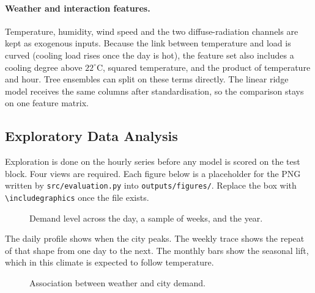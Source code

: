 \paragraph{Weather and interaction features.}
Temperature, humidity, wind speed and the two diffuse-radiation channels are
kept as exogenous inputs. Because the link between temperature and load is
curved (cooling load rises once the day is hot), the feature set also
includes a cooling degree above \(22^\circ\mathrm{C}\), squared temperature,
and the product of temperature and hour. Tree ensembles can split on these
terms directly. The linear ridge model receives the same columns after
standardisation, so the comparison stays on one feature matrix.

\subsection{Exploratory Data Analysis}
\label{sec:eda}

Exploration is done on the hourly series before any model is scored on the
test block. Four views are required. Each figure below is a placeholder for
the PNG written by \texttt{src/evaluation.py} into \texttt{outputs/figures/}.
Replace the box with \verb|\includegraphics| once the file exists.

\begin{figure}[h]
  \centering
  \caption{Demand level across the day, a sample of weeks, and the year.}
  \label{fig:seasonality}
\end{figure}

The daily profile shows when the city peaks. The weekly trace shows the
repeat of that shape from one day to the next. The monthly bars show the
seasonal lift, which in this climate is expected to follow temperature.

\begin{figure}[h]
  \centering
  \caption{Association between weather and city demand.}
  \label{fig:weather}
\end{figure}

